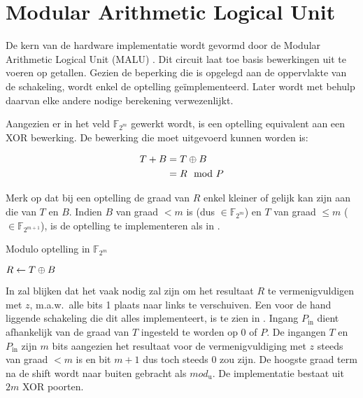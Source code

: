 \section{Modular Arithmetic Logical Unit\label{sectie-implementatie-malu}}

De kern van de hardware implementatie wordt gevormd door de Modular Arithmetic Logical Unit (MALU) \cite{sakiyama, batina-lowcost}. Dit circuit laat toe basis bewerkingen uit te voeren op getallen. Gezien de beperking die is opgelegd aan de oppervlakte van de schakeling, wordt enkel de optelling ge\"implementeerd. Later wordt met behulp daarvan elke andere nodige berekening verwezenlijkt.

Aangezien er in het veld $\mathbb{F}_{2^m}$ gewerkt wordt, is een optelling equivalent aan een XOR bewerking. De bewerking die moet uitgevoerd kunnen worden is:

\[\begin{aligned}
T + B	&= T \oplus B\\
		&= R \mod P
\end{aligned}\]

Merk op dat bij een optelling de graad van $R$ enkel kleiner of gelijk kan zijn aan die van $T$ en $B$. Indien $B$ van graad $< m$ is (dus $\in \mathbb{F}_{2^m}$) en $T$ van graad $\leq m$ ($\in \mathbb{F}_{2^{m+1}}$), is de optelling te implementeren als in .

\begin{algorithm}[h]
	\caption{Modulo optelling in $\mathbb{F}_{2^m}$}
	\label{algoritme-implementatie-malu-modulo}

	$R \leftarrow T \oplus B$\;

\end{algorithm}

In  zal blijken dat het vaak nodig zal zijn om het resultaat $R$ te vermenigvuldigen met $z$, m.a.w.\ alle bits 1 plaats naar links te verschuiven. Een voor de hand liggende schakeling die dit alles implementeert, is te zien in . Ingang $P_{\text{in}}$ dient afhankelijk van de graad van $T$ ingesteld te worden op $0$ of $P$. De ingangen $T$ en $P_{\text{in}}$ zijn $m$ bits aangezien het resultaat voor de vermenigvuldiging met $z$ steeds van graad $< m$ is en bit $m + 1$ dus toch steeds 0 zou zijn. De hoogste graad term na de shift wordt naar buiten gebracht als $mod_{\text{u}}$. De implementatie bestaat uit $2m$ XOR poorten.

